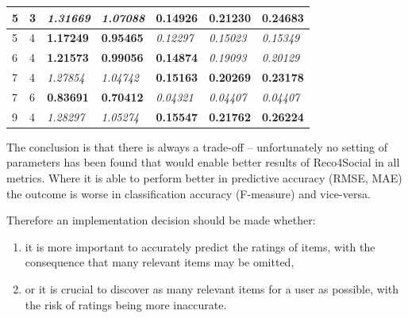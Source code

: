 \documentclass[12pt]{report}
\begin{document}
\begin{table}[hptb]
\begin{tabular}{lllllll}
\multicolumn{1}{|l|}{5}       & \multicolumn{1}{l|}{3}                        & \multicolumn{1}{l|}{{\it 1.31669}} & \multicolumn{1}{l|}{{\it 1.07088}} & \multicolumn{1}{l|}{{\bf 0.14926}}      & \multicolumn{1}{l|}{{\bf 0.21230}}      & \multicolumn{1}{l|}{{\bf 0.24683}}      \\ \hline
\multicolumn{1}{|l|}{5}       & \multicolumn{1}{l|}{4}                        & \multicolumn{1}{l|}{{\bf 1.17249}} & \multicolumn{1}{l|}{{\bf 0.95465}} & \multicolumn{1}{l|}{{\it 0.12297}}      & \multicolumn{1}{l|}{{\it 0.15023}}      & \multicolumn{1}{l|}{{\it 0.15349}}      \\ \hline
\multicolumn{1}{|l|}{6}       & \multicolumn{1}{l|}{4}                        & \multicolumn{1}{l|}{{\bf 1.21573}} & \multicolumn{1}{l|}{{\bf 0.99056}} & \multicolumn{1}{l|}{{\bf 0.14874}}      & \multicolumn{1}{l|}{{\it 0.19093}}      & \multicolumn{1}{l|}{{\it 0.20129}}      \\ \hline
\multicolumn{1}{|l|}{7}       & \multicolumn{1}{l|}{4}                        & \multicolumn{1}{l|}{{\it 1.27854}} & \multicolumn{1}{l|}{{\it 1.04742}} & \multicolumn{1}{l|}{{\bf 0.15163}}      & \multicolumn{1}{l|}{{\bf 0.20269}}      & \multicolumn{1}{l|}{{\bf 0.23178}}      \\ \hline
\multicolumn{1}{|l|}{7}       & \multicolumn{1}{l|}{6}                        & \multicolumn{1}{l|}{{\bf 0.83691}} & \multicolumn{1}{l|}{{\bf 0.70412}} & \multicolumn{1}{l|}{{\it 0.04321}}      & \multicolumn{1}{l|}{{\it 0.04407}}      & \multicolumn{1}{l|}{{\it 0.04407}}      \\ \hline
\multicolumn{1}{|l|}{9}       & \multicolumn{1}{l|}{4}                        & \multicolumn{1}{l|}{{\it 1.28297}} & \multicolumn{1}{l|}{{\it 1.05274}} & \multicolumn{1}{l|}{{\bf 0.15547}}      & \multicolumn{1}{l|}{{\bf 0.21762}}      & \multicolumn{1}{l|}{{\bf 0.26224}}      \\ \hline
\end{tabular}
\end{table}


The conclusion is that there is always a trade-off -- unfortunately no setting of parameters has been found that would enable better results of Reco4Social in all metrics. Where it is able to perform better in predictive accuracy (RMSE, MAE) the outcome is worse in classification accuracy (F-measure) and vice-versa. 

Therefore an implementation decision should be made whether:
\begin{enumerate}
\item it is more important to accurately predict the ratings of items, with the consequence that many relevant items may be omitted,
\item or it is crucial to discover as many relevant items for a user as possible, with the risk of ratings being more inaccurate.
\end{enumerate}
\end{document}
